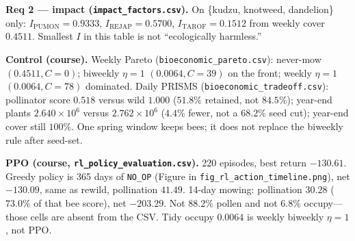 \documentclass[11pt]{article}
\begin{document}
\medskip
\noindent\textbf{Req 2 --- impact
(\texttt{impact\_factors.csv}).}
On \{kudzu, knotweed, dandelion\} only:
$I_{\mathrm{PUMON}}=0.9333$, $I_{\mathrm{REJAP}}=0.5700$,
$I_{\mathrm{TAROF}}=0.1512$ from weekly cover $0.4511$.
Smallest $I$ in this table is not ``ecologically harmless.''

\medskip
\noindent\textbf{Control (course).}
Weekly Pareto (\texttt{bioeconomic\_pareto.csv}): never-mow $(0.4511,C=0)$;
biweekly $\eta=1$ $(0.0064,C=39)$ on the front; weekly $\eta=1$
$(0.0064,C=78)$ dominated.
Daily PRISMS (\texttt{bioeconomic\_tradeoff.csv}):
pollinator score $0.518$ versus wild $1.000$ ($\mathbf{51.8\%}$ retained,
not $84.5\%$);
year-end plants $2.640\times 10^{6}$ versus $2.762\times 10^{6}$
($\mathbf{4.4\%}$ fewer, not a $68.2\%$ seed cut);
year-end cover still $100\%$.
One spring window keeps bees; it does not replace the biweekly rule after
seed-set.

\medskip
\noindent\textbf{PPO (course, \texttt{rl\_policy\_evaluation.csv}).}
220 episodes, best return $-130.61$.
Greedy policy is 365 days of \texttt{NO\_OP} (Figure in
\texttt{fig\_rl\_action\_timeline.png}), net $-130.09$, same as rewild,
pollination $41.49$.
14-day mowing: pollination $30.28$ ($73.0\%$ of that bee score), net $-203.29$.
Not $88.2\%$ pollen and not $6.8\%$ occupy---those cells are absent from the
CSV. Tidy occupy $0.0064$ is weekly biweekly $\eta=1$, not PPO.
\end{document}
